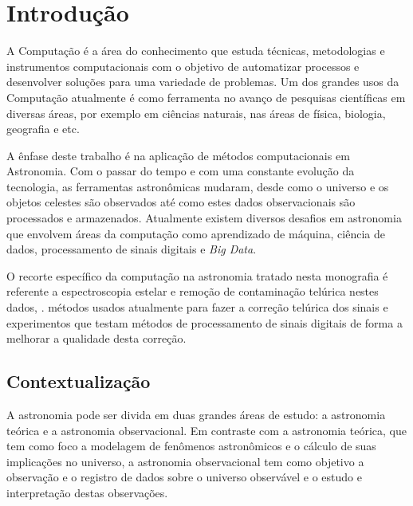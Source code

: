 \chapter{Introdução}
\label{cap:introducao}

A Computação é a área do conhecimento que estuda técnicas, metodologias e instrumentos computacionais com o objetivo de automatizar processos e desenvolver soluções para uma variedade de problemas. Um dos grandes usos da Computação atualmente é como ferramenta no avanço de pesquisas científicas em diversas áreas, por exemplo em ciências naturais, nas áreas de física, biologia, geografia e etc.

A ênfase deste trabalho é na aplicação de métodos computacionais em Astronomia. Com o passar do tempo e com uma constante evolução da tecnologia, as ferramentas astronômicas mudaram, desde como o universo e os objetos celestes são observados até como estes dados observacionais são processados e armazenados. Atualmente existem diversos desafios em astronomia que envolvem áreas da computação como aprendizado de máquina, ciência de dados, processamento de sinais digitais e \textit{Big Data}. 

O recorte específico da computação na astronomia tratado nesta monografia é referente a espectroscopia estelar e remoção de contaminação telúrica nestes dados, .   métodos usados atualmente para fazer a correção telúrica dos sinais e experimentos que testam métodos de processamento de sinais digitais de forma a melhorar a qualidade desta correção.

\section{Contextualização}

A astronomia pode ser divida em duas grandes áreas de estudo: a astronomia teórica e a astronomia observacional. Em contraste com a astronomia teórica, que tem como foco a modelagem de fenômenos astronômicos e o cálculo de suas implicações no universo, a astronomia observacional tem como objetivo a observação e o registro de dados sobre o universo observável e o estudo e interpretação destas observações.  

